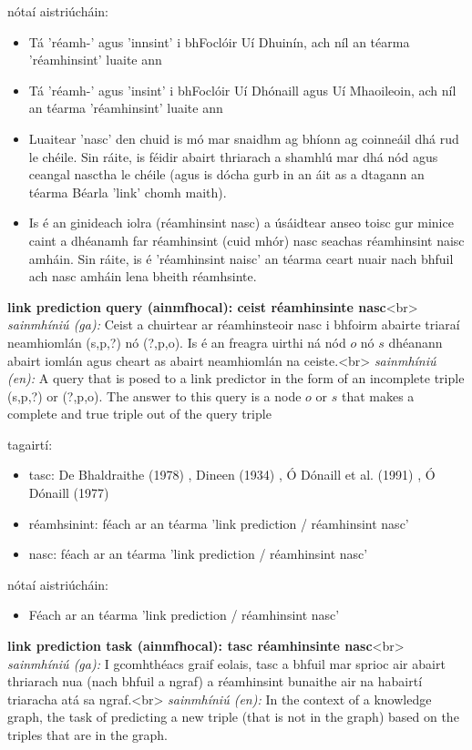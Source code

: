 \documentclass{article}
\begin{document}
nótaí aistriúcháin:
\begin{itemize}
	\item Tá 'réamh-' agus 'innsint' i bhFoclóir Uí Dhuinín, ach níl an téarma 'réamhinsint' luaite ann
	\item Tá 'réamh-' agus 'insint' i bhFoclóir Uí Dhónaill agus Uí Mhaoileoin, ach níl an téarma 'réamhinsint' luaite ann
	\item Luaitear 'nasc' den chuid is mó mar snaidhm ag bhíonn ag coinneáil dhá rud le chéile. Sin ráite, is féidir abairt thriarach a shamhlú mar dhá nód agus ceangal nasctha le chéile (agus is dócha gurb in an áit as a dtagann an téarma Béarla 'link' chomh maith).
	\item Is é an ginideach iolra (réamhinsint nasc) a úsáidtear anseo toisc gur minice caint a dhéanamh far réamhinsint (cuid mhór) nasc seachas réamhinsint naisc amháin. Sin ráite, is é 'réamhinsint naisc' an téarma ceart nuair nach bhfuil ach nasc amháin lena bheith réamhsinte.
\end{itemize}


\textbf{link prediction query (ainmfhocal): ceist réamhinsinte nasc}<br>
\textit{sainmhíniú (ga):} Ceist a chuirtear ar réamhinsteoir nasc i bhfoirm abairte triaraí neamhiomlán (s,p,?) nó (?,p,o). Is é an freagra uirthi ná nód $o$ nó $s$ dhéanann abairt iomlán agus cheart as abairt neamhiomlán na ceiste.<br>
\textit{sainmhíniú (en):} A query that is posed to a link predictor in the form of an incomplete triple (s,p,?) or (?,p,o). The answer to this query is a node $o$ or $s$ that makes a complete and true triple out of the query triple

tagairtí:
\begin{itemize}
	\item tasc: De Bhaldraithe (1978) \cite{de-bhaldraithe}, Dineen (1934) \cite{dineen}, Ó Dónaill et al. (1991) \cite{focloir-beag}, Ó Dónaill (1977) \cite{odonaill}
	\item réamhsinint: féach ar an téarma 'link prediction / réamhinsint nasc'
	\item nasc: féach ar an téarma 'link prediction / réamhinsint nasc'
\end{itemize}

nótaí aistriúcháin:
\begin{itemize}
	\item Féach ar an téarma 'link prediction / réamhinsint nasc'
\end{itemize}


\textbf{link prediction task (ainmfhocal): tasc réamhinsinte nasc}<br>
\textit{sainmhíniú (ga):} I gcomhthéacs graif eolais, tasc a bhfuil mar sprioc air abairt thriarach nua (nach bhfuil a ngraf) a réamhinsint bunaithe air na habairtí triaracha atá sa ngraf.<br>
\textit{sainmhíniú (en):} In the context of a knowledge graph, the task of predicting a new triple (that is not in the graph) based on the triples that are in the graph.
\end{document}

